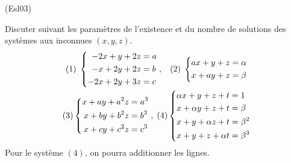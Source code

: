 \begin{tiny}(Esl03)\end{tiny} Discuter suivant les paramètres de l'existence et du nombre de solutions des systèmes aux inconnues $(x,y,z)$.
\begin{multline*}
(1) \;\left\lbrace 
\begin{aligned}
 -2x + y + 2z &= a \\
 -x + 2y + 2z &= b\\
 -2x +2y +3z &= c
\end{aligned}
\right. ,\hspace{0.3cm}
(2)\;\left\lbrace 
\begin{aligned}
  ax+y+z &= \alpha \\
  x+ay+z &= \beta
\end{aligned}
\right. \\
(3)\left\lbrace 
\begin{aligned}
 x + ay + a^2z &= a^3 \\
 x + by + b^2z &= b^3\\
 x + cy + c^2z &= c^3
\end{aligned}
\right.  ,\;
(4)\left\lbrace 
\begin{aligned}
 \alpha x + y + z + t &= 1 \\
 x + \alpha y + z + t &= \beta\\
 x + y + \alpha z + t &= \beta^2 \\
 x + y + z + \alpha t &= \beta^3
\end{aligned}
\right.
\end{multline*}
Pour le système $(4)$, on pourra additionner les lignes.
